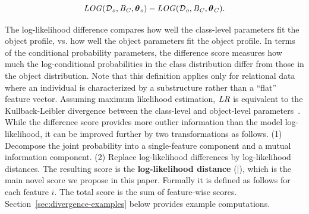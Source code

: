 \documentclass[conference]{IEEEtran}
\begin{document}
\begin{equation} \label{eq:log-diff}
\loglikelihood(\D_{\object},\model_{\Class},\parameters_{\object}) - \loglikelihood(\D_{\object},\model_{\Class},\parameters_{\Class}).
\end{equation}

The log-likelihood difference compares  how well the class-level parameters fit the object profile, vs. how well the object parameters fit the object profile. In terms of the conditional probability parameters, the difference score measures how much the log-conditional probabilities in the class distribution differ from those in the object distribution. Note that this definition applies only for relational data where an individual is characterized by a substructure rather than a ``flat'' feature vector. Assuming maximum likelihood estimation, $\it{LR}$ is equivalent to the Kullback-Leibler divergence between the class-level and object-level parameters~\cite{Campos2006}. 
%
While the difference score provides more outlier information than the model log-likelihood, it can be improved further by two transformations as follows. (1) Decompose the joint probability into a single-feature component and a mutual information component. (2) Replace log-likelihood differences by log-likelihood distances. The resulting score is the \textbf{log-likelihood distance} ($\mid$), which is the main novel score we propose in this paper. Formally it is defined as follows for each feature $i$. The total score is the sum of feature-wise scores. Section~\ref{sec:divergence-examples} below provides example computations.
\end{document}
